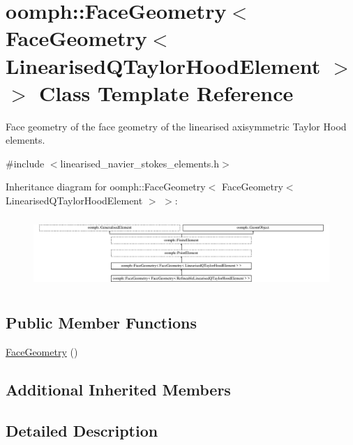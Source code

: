 \hypertarget{classoomph_1_1FaceGeometry_3_01FaceGeometry_3_01LinearisedQTaylorHoodElement_01_4_01_4}{}\section{oomph\+:\+:Face\+Geometry$<$ Face\+Geometry$<$ Linearised\+Q\+Taylor\+Hood\+Element $>$ $>$ Class Template Reference}
\label{classoomph_1_1FaceGeometry_3_01FaceGeometry_3_01LinearisedQTaylorHoodElement_01_4_01_4}


Face geometry of the face geometry of the linearised axisymmetric Taylor Hood elements.  




{\ttfamily \#include $<$linearised\+\_\+navier\+\_\+stokes\+\_\+elements.\+h$>$}

Inheritance diagram for oomph\+:\+:Face\+Geometry$<$ Face\+Geometry$<$ Linearised\+Q\+Taylor\+Hood\+Element $>$ $>$\+:\begin{figure}[H]
\begin{center}
\leavevmode
\includegraphics[height=2.713178cm]{classoomph_1_1FaceGeometry_3_01FaceGeometry_3_01LinearisedQTaylorHoodElement_01_4_01_4}
\end{center}
\end{figure}
\subsection*{Public Member Functions}
\begin{DoxyCompactItemize}
\item 
\hyperlink{classoomph_1_1FaceGeometry_3_01FaceGeometry_3_01LinearisedQTaylorHoodElement_01_4_01_4_a9ed8ce2c18553c1312e565db942f3b2b}{Face\+Geometry} ()
\end{DoxyCompactItemize}
\subsection*{Additional Inherited Members}


\subsection{Detailed Description}

